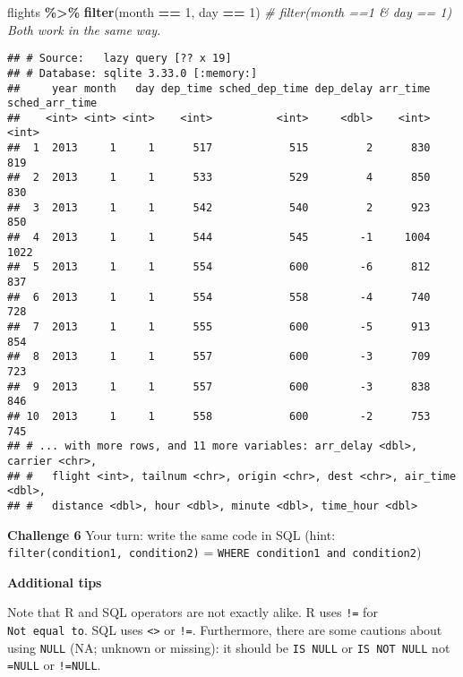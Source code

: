 \documentclass[
]{book}
\newenvironment{Shaded}{\begin{snugshade}}{\end{snugshade}}
\newcommand{\CommentTok}[1]{\textcolor[rgb]{0.56,0.35,0.01}{\textit{#1}}}
\newcommand{\DecValTok}[1]{\textcolor[rgb]{0.00,0.00,0.81}{#1}}
\newcommand{\KeywordTok}[1]{\textcolor[rgb]{0.13,0.29,0.53}{\textbf{#1}}}
\newcommand{\NormalTok}[1]{#1}
\newcommand{\OperatorTok}[1]{\textcolor[rgb]{0.81,0.36,0.00}{\textbf{#1}}}
\newcommand{\StringTok}[1]{\textcolor[rgb]{0.31,0.60,0.02}{#1}}
\begin{document}
\begin{Shaded}
\begin{Highlighting}[]
\NormalTok{flights }\OperatorTok{\%\textgreater{}\%}\StringTok{ }
\StringTok{  }\KeywordTok{filter}\NormalTok{(month }\OperatorTok{==}\StringTok{ }\DecValTok{1}\NormalTok{, day }\OperatorTok{==}\StringTok{ }\DecValTok{1}\NormalTok{) }\CommentTok{\# filter(month ==1 \& day == 1) Both work in the same way.}
\end{Highlighting}
\end{Shaded}

\begin{verbatim}
## # Source:   lazy query [?? x 19]
## # Database: sqlite 3.33.0 [:memory:]
##     year month   day dep_time sched_dep_time dep_delay arr_time sched_arr_time
##    <int> <int> <int>    <int>          <int>     <dbl>    <int>          <int>
##  1  2013     1     1      517            515         2      830            819
##  2  2013     1     1      533            529         4      850            830
##  3  2013     1     1      542            540         2      923            850
##  4  2013     1     1      544            545        -1     1004           1022
##  5  2013     1     1      554            600        -6      812            837
##  6  2013     1     1      554            558        -4      740            728
##  7  2013     1     1      555            600        -5      913            854
##  8  2013     1     1      557            600        -3      709            723
##  9  2013     1     1      557            600        -3      838            846
## 10  2013     1     1      558            600        -2      753            745
## # ... with more rows, and 11 more variables: arr_delay <dbl>, carrier <chr>,
## #   flight <int>, tailnum <chr>, origin <chr>, dest <chr>, air_time <dbl>,
## #   distance <dbl>, hour <dbl>, minute <dbl>, time_hour <dbl>
\end{verbatim}

\textbf{Challenge 6}
Your turn: write the same code in SQL (hint: \texttt{filter(condition1,\ condition2)} = \texttt{WHERE\ condition1\ and\ condition2})

\textbf{Additional tips}

Note that R and SQL operators are not exactly alike. R uses \texttt{!=} for \texttt{Not\ equal\ to}. SQL uses \texttt{\textless{}\textgreater{}} or \texttt{!=}. Furthermore, there are some cautions about using \texttt{NULL} (NA; unknown or missing): it should be \texttt{IS\ NULL} or \texttt{IS\ NOT\ NULL} not \texttt{=NULL} or \texttt{!=NULL}.
\end{document}
